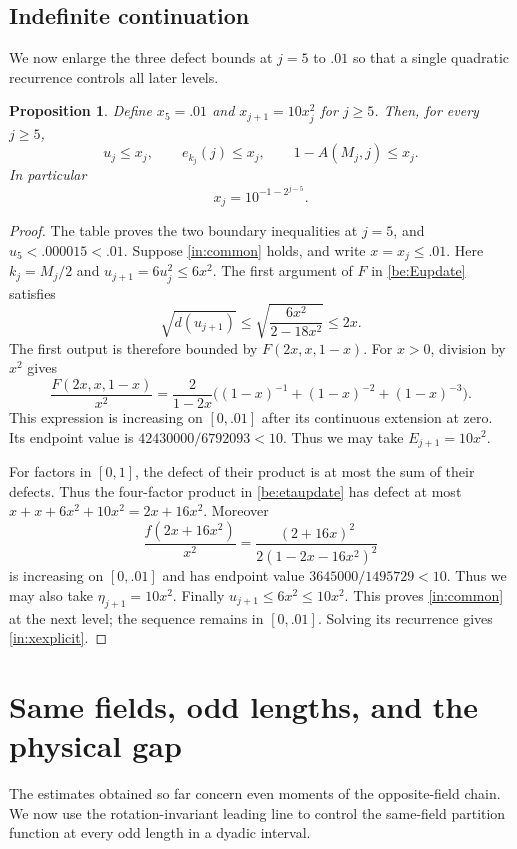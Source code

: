 \documentclass[11pt]{article}
\newtheorem{proposition}[theorem]{Proposition}
\theoremstyle{remark}
\numberwithin{equation}{section}
\begin{document}
\subsection{Indefinite continuation}
We now enlarge the three defect bounds at $j=5$ to $.01$ so that a
single quadratic recurrence controls all later levels.

\begin{proposition}\label{in:quadratic}
Define $x_5=.01$ and $x_{j+1}=10x_j^2$ for $j\ge5$. Then, for every
$j\ge5$,
\begin{equation}\label{in:common}
 u_j\le x_j,\qquad e_{k_j}(j)\le x_j,\qquad
 1-A(M_j,j)\le x_j.
\end{equation}
In particular
\begin{equation}\label{in:xexplicit}
 x_j=10^{-1-2^{j-5}}.
\end{equation}
\end{proposition}
\begin{proof}
The table proves the two boundary inequalities at $j=5$, and
$u_5<.000015<.01$. Suppose \eqref{in:common} holds, and write
$x=x_j\le.01$. Here $k_j=M_j/2$ and $u_{j+1}=6u_j^2\le6x^2$.
The first argument of $F$ in \eqref{be:Eupdate} satisfies
\[
 \sqrt{d(u_{j+1})}\le
 \sqrt{\frac{6x^2}{2-18x^2}}\le2x.
\]
The first output is therefore bounded by
$F(2x,x,1-x)$. For $x>0$, division by $x^2$ gives
\[
 \frac{F(2x,x,1-x)}{x^2}
 =\frac{2}{1-2x}\bigl((1-x)^{-1}+(1-x)^{-2}+(1-x)^{-3}\bigr).
\]
This expression is increasing on $[0,.01]$ after its continuous
extension at zero. Its endpoint value is
$42430000/6792093<10$. Thus we may take $E_{j+1}=10x^2$.

For factors in $[0,1]$, the defect of their product is at most the sum
of their defects. Thus the four-factor product in \eqref{be:etaupdate}
has defect at most $x+x+6x^2+10x^2=2x+16x^2$. Moreover
\[
 \frac{f(2x+16x^2)}{x^2}
 =\frac{(2+16x)^2}{2(1-2x-16x^2)^2}
\]
is increasing on $[0,.01]$ and has endpoint value
$3645000/1495729<10$. Thus we may also take
$\eta_{j+1}=10x^2$. Finally $u_{j+1}\le6x^2\le10x^2$.
This proves \eqref{in:common} at the next level; the sequence remains
in $[0,.01]$. Solving its recurrence gives \eqref{in:xexplicit}.
\end{proof}

\section{Same fields, odd lengths, and the physical gap}\label{sec:conclusion}
The estimates obtained so far concern even moments of the opposite-field
chain. We now use the rotation-invariant leading line to control the
same-field partition function at every odd length in a dyadic interval.
\end{document}
